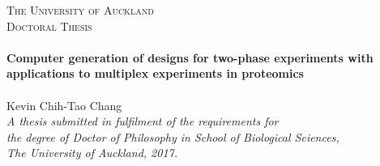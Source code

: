 \begin{titlepage}
\begin{center}

\begin{figure}[h!]
\end{figure}

\textsc{\LARGE The University of Auckland}\\[1.5cm] %
\textsc{\Large Doctoral Thesis}\\[0.5cm] %

\HRule \\[0.4cm] %
{\huge \bfseries Computer generation of designs for two-phase experiments with applications to multiplex experiments in proteomics}\\[0.4cm] %
\HRule \\[1.5cm] %

\LARGE Kevin Chih-Tao Chang \\[3cm]

\large \textit{A thesis submitted in fulfilment of the requirements for \\the
degree of Doctor of Philosophy in 
School of Biological Sciences,\\
The University of Auckland, 2017.}\\[2.5cm]

 \vfill
\end{center}
\end{titlepage}
